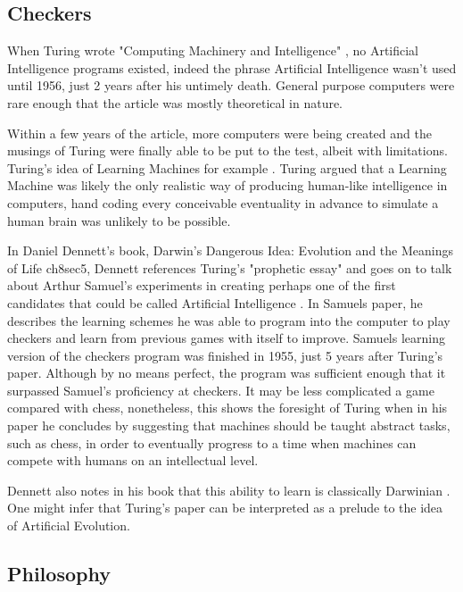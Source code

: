 \documentclass{scrartcl}
\begin{document}
\subsection{Checkers}
When Turing wrote "Computing Machinery and Intelligence" \cite{turing1950computing:1}, no Artificial Intelligence programs existed, indeed the phrase Artificial Intelligence wasn't used until 1956, just 2 years after his untimely death. General purpose computers were rare enough that the article was mostly theoretical in nature. \par
Within a few years of the article, more computers were being created and the musings of Turing were finally able to be put to the test, albeit with limitations. Turing's idea of Learning Machines for example \cite{ramscar2010computing:2}. Turing argued that a Learning Machine was likely the only realistic way of producing human-like intelligence in computers, hand coding every conceivable eventuality in advance to simulate a human brain was unlikely to be possible. \par
In Daniel Dennett's book, Darwin's Dangerous Idea: Evolution and the Meanings of Life \cite{dennett1996darwin:3}ch8sec5, Dennett references Turing's "prophetic essay" and goes on to talk about Arthur Samuel's experiments in creating perhaps one of the first candidates that could be called Artificial Intelligence \cite{samuel2000some:4}. In Samuels paper, he describes the learning schemes he was able to program into the computer to play checkers and learn from previous games with itself to improve. Samuels learning version of the checkers program was finished in 1955, just 5 years after Turing's paper. Although by no means perfect, the program was sufficient enough that it surpassed Samuel's proficiency at checkers. It may be less complicated a game compared with chess, nonetheless, this shows the foresight of Turing when in his paper he concludes by suggesting that machines should be taught abstract tasks, such as chess, in order to eventually progress to a time when machines can compete with humans on an intellectual level. \par
Dennett also notes in his book that this ability to learn is classically Darwinian \cite{darwin2009origin:5}. One might infer that Turing's paper can be interpreted as a prelude to the idea of Artificial Evolution.

\subsection{Philosophy}
\end{document}
